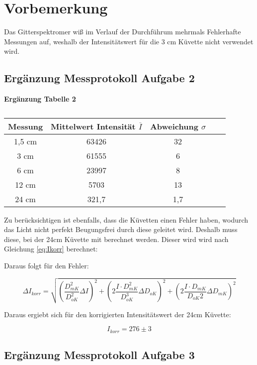 \section{Vorbemerkung}
Das Gitterspektromer wiß im Verlauf der Durchführum mehrmals Fehlerhafte Messungen auf, weshalb der Intensitätswert für die 3 cm Küvette nicht verwendet wird.

\subsection{Ergänzung Messprotokoll Aufgabe 2}
\begin{table}[h!]
    \centering
    \textbf{Ergänzung Tabelle 2} \\ \smallskip
    \begin{tabular}{c c c c c}
        
        \toprule 
        Messung & Mittelwert Intensität $\overline{I}$ & Abweichung $\sigma$\\
        \midrule
        1,5 cm & 63426 & 32 \\
        3 cm & 61555 & 6 \\
        6 cm & 23997 & 8 \\
        12 cm & 5703 & 13 \\
        24 cm & 321,7 & 1,7 \\
        \bottomrule
        
    \end{tabular}
    \caption{}
\end{table}

Zu berücksichtigen ist ebenfalls, dass die Küvetten einen
Fehler haben, wodurch das Licht nicht perfekt Beugungsfrei
durch diese geleitet wird. Deshalb muss diese, bei der 24cm Küvette mit berechnet werden. Dieser wird wird nach Gleichung \ref{eq:Ikorr} berechnet:

Daraus folgt für den Fehler:

\begin{equation}
    \Delta I_{korr} = \sqrt{(\frac{D_{mK}^2}{D_{oK}^2} \Delta I)^2 + (2\frac{I \cdot D_{mK}^2}{D_{oK}^3}\Delta D_{oK})^2 + (2 \frac{I \cdot D_{mK}}{D_{oK}2} \Delta D_{mK})^2}
\end{equation}

Daraus ergiebt sich für den korrigierten Intensitätswert der 24cm Küvette:

\[ I_{korr} = 276 \pm 3 \]

\subsection{Ergänzung Messprotokoll Aufgabe 3}

